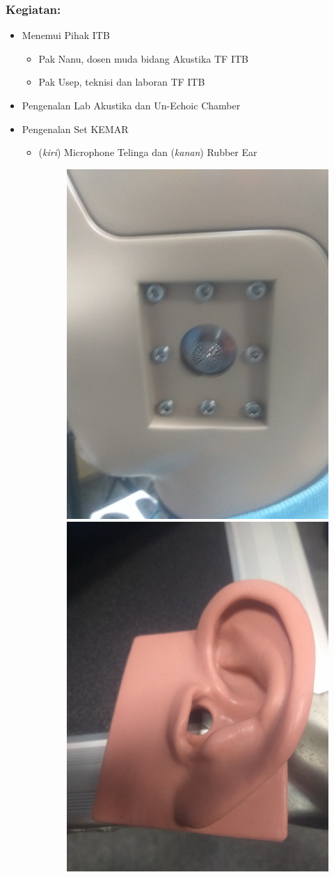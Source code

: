 \documentclass[12pt,]{article}
\begin{document}
	\subsubsection{Kegiatan:}
	\begin{itemize}
		\item Menemui Pihak ITB
		\begin{itemize}
			\item Pak Nanu, dosen muda bidang Akustika TF ITB
			\item Pak Usep, teknisi dan laboran TF ITB
		\end{itemize}
		\item Pengenalan Lab Akustika dan Un-Echoic Chamber
		\item Pengenalan Set KEMAR
		\begin{itemize}
			\item (\textit{kiri}) Microphone Telinga dan (\textit{kanan}) Rubber Ear
			\begin{figure}[H]
				\centering
				\includegraphics[width=0.25\linewidth]{day_0/ear}
				\includegraphics[width=0.25\linewidth]{day_0/earleaf}
			\end{figure}
		

\end{itemize}
\end{itemize}
\end{document}
